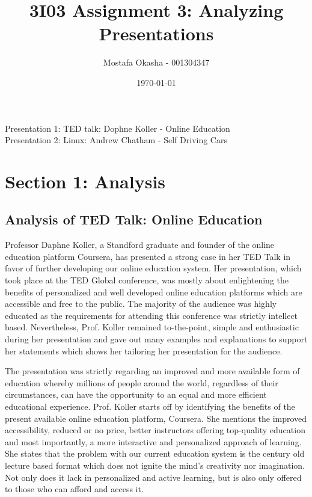 \documentclass[12pt]{article}
\title{3I03 Assignment 3: Analyzing Presentations}
\author{Mostafa Okasha - 001304347}
\date{\today}
\begin{document}
\maketitle
\vspace{50mm} %
\setlength{\parindent}{3.5cm}
\hangindent=3.5cm 
Presentation 1: TED talk: Dophne Koller - Online Education\\ Presentation 2: Linux: Andrew Chatham - Self Driving Cars

\newpage

\section*{Section 1: Analysis}
\subsection*{Analysis of TED Talk: Online Education}
\setlength{\parindent}{1.5cm}
\vspace{5mm} %

    Professor Daphne Koller, a Standford graduate and founder of the online education platform Coursera, has presented a strong case in her TED Talk in favor of further developing our online education system. Her presentation, which took place at the TED Global conference, was mostly about enlightening the benefits of personalized and well developed online education platforms which are accessible and free to the public. The majority of the audience was highly educated as the requirements for attending this conference was strictly intellect based. Nevertheless, Prof. Koller remained to-the-point, simple and enthusiastic during her presentation and gave out many examples and explanations to support her statements which shows her tailoring her presentation for the audience.
    
\vspace{2.5mm} %


    The presentation was strictly regarding an improved and more available form of education whereby millions of people around the world, regardless of their circumstances, can have the opportunity to an equal and more efficient educational experience. Prof. Koller starts off by identifying the benefits of the present available online education platform, Coursera. She mentions the improved accessibility, reduced or no price, better instructors offering top-quality education and most importantly, a more interactive and personalized approach of learning. She states that the problem with our current education system is the century old lecture based format which does not ignite the mind's creativity nor imagination. Not only does it lack in personalized and active learning, but is also only offered to those who can afford and access it.
    
\end{document}

